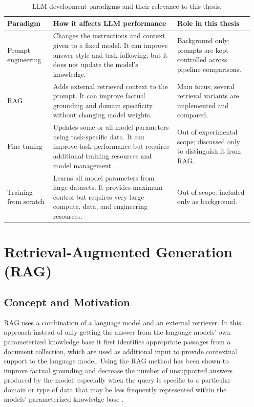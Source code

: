 \begin{table}[htbp]
\centering
\small
\begin{tabularx}{\textwidth}{>{\raggedright\arraybackslash}p{}>{\raggedright\arraybackslash}X>{\raggedright\arraybackslash}p{}}
\toprule
\textbf{Paradigm} & \textbf{How it affects LLM performance} & \textbf{Role in this thesis} \\
\midrule
Prompt engineering & Changes the instructions and context given to a fixed model. It can improve answer style and task following, but it does not update the model's knowledge. & Background only; prompts are kept controlled across pipeline comparisons. \\
\ac{RAG} & Adds external retrieved context to the prompt. It can improve factual grounding and domain specificity without changing model weights. & Main focus; several retrieval variants are implemented and compared. \\
Fine-tuning & Updates some or all model parameters using task-specific data. It can improve task performance but requires additional training resources and model management. & Out of experimental scope; discussed only to distinguish it from \ac{RAG}. \\
Training from scratch & Learns all model parameters from large datasets. It provides maximum control but requires very large compute, data, and engineering resources. & Out of scope; included only as background. \\
\bottomrule
\end{tabularx}
\caption{LLM development paradigms and their relevance to this thesis.}
\label{tab:llm-development-paradigms}
\end{table}

\section{Retrieval-Augmented Generation (RAG)}

\subsection{Concept and Motivation}

\ac{RAG} uses a combination of a language model and an external retriever. In this approach instead of only getting the answer from the language models' own parameterized knowledge base it first identifies appropriate passages from a document collection, which are used as additional input to provide contextual support to the language model. Using the \ac{RAG} method has been shown to improve factual grounding and decrease the number of unsupported answers produced by the model; especially when the query is specific to a particular domain or type of data that may be less frequently represented within the models' parameterized knowledge base \cite{lewis2020rag}.


